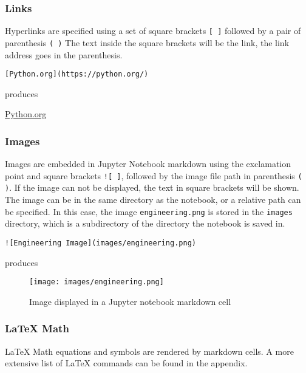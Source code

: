 \documentclass{book}
\makeatletter
\def\maxwidth{\ifdim\Gin@nat@width>\linewidth\linewidth
\else\Gin@nat@width\fi}
\let\Oldincludegraphics\includegraphics
\renewcommand{\includegraphics}[1]{\Oldincludegraphics[width=.8\maxwidth]{#1}}
\newcommand{\passthrough}[1]{#1}
\makeatother
\begin{document}
\hypertarget{links}{%
\subsubsection{Links}\label{links}}

Hyperlinks are specified using a set of square brackets
\passthrough{\lstinline![ ]!} followed by a pair of parenthesis
\passthrough{\lstinline!( )!} The text inside the square brackets will
be the link, the link address goes in the parenthesis.

\begin{lstlisting}
[Python.org](https://python.org/)
\end{lstlisting}

produces

\href{https://python.org}{Python.org}

\hypertarget{images}{%
\subsubsection{Images}\label{images}}

Images are embedded in Jupyter Notebook markdown using the exclamation
point and square brackets \passthrough{\lstinline"![ ]"}, followed by
the image file path in parenthesis \passthrough{\lstinline!( )!}. If the
image can not be displayed, the text in square brackets will be shown.
The image can be in the same directory as the notebook, or a relative
path can be specified. In this case, the image
\passthrough{\lstinline!engineering.png!} is stored in the
\passthrough{\lstinline!images!} directory, which is a subdirectory of
the directory the notebook is saved in.

\begin{lstlisting}
![Engineering Image](images/engineering.png)
\end{lstlisting}

produces

\begin{figure}
\centering
\texttt{[image: images/engineering.png]}
\caption{Image displayed in a Jupyter notebook markdown cell}
\end{figure}

\hypertarget{latex-math}{%
\subsubsection{LaTeX Math}\label{latex-math}}

LaTeX Math equations and symbols are rendered by markdown cells. A more
extensive list of LaTeX commands can be found in the appendix.
\end{document}
